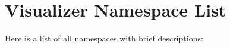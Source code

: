 \section{Visualizer Namespace List}
Here is a list of all namespaces with brief descriptions:\begin{CompactList}
\item{}
\end{CompactList}
